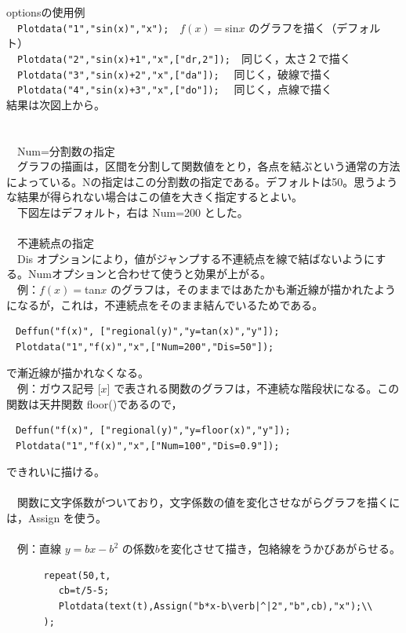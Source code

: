 \documentclass[papersize,a4paper,12pt,uplatex]{jsarticle}
\begin{document}
\begin{description}
optionsの使用例\\
　\verb|Plotdata("1","sin(x)","x");|　$f(x)=$sin$x$ のグラフを描く（デフォルト）\\
　\verb|Plotdata("2","sin(x)+1","x",["dr,2"]);|　同じく，太さ２で描く\\
　\verb|Plotdata("3","sin(x)+2","x",["da"]);|　 同じく，破線で描く\\
　\verb|Plotdata("4","sin(x)+3","x",["do"]);|　 同じく，点線で描く\\
結果は次図上から。\\
　\\
　　　　　\\

　Num=分割数の指定\\
　グラフの描画は，区間を分割して関数値をとり，各点を結ぶという通常の方法によっている。Nの指定はこの分割数の指定である。デフォルトは50。思うような結果が得られない場合はこの値を大きく指定するとよい。\\
　下図左はデフォルト，右は Num=200 とした。\\

　　　　\\

　不連続点の指定\\
　Dis オプションにより，値がジャンプする不連続点を線で結ばないようにする。Numオプションと合わせて使うと効果が上がる。\\

　例：$f(x)=$tan$x$ のグラフは，そのままではあたかも漸近線が描かれたようになるが，これは，不連続点をそのまま結んでいるためである。
\begin{verbatim}
　Deffun("f(x)", ["regional(y)","y=tan(x)","y"]);
　Plotdata("1","f(x)","x",["Num=200","Dis=50"]);
\end{verbatim}
で漸近線が描かれなくなる。\\

　例：ガウス記号 [$x$] で表される関数のグラフは，不連続な階段状になる。この関数は天井関数 floor()であるので，
\begin{verbatim}
　Deffun("f(x)", ["regional(y)","y=floor(x)","y"]);
　Plotdata("1","f(x)","x",["Num=100","Dis=0.9"]);
\end{verbatim}
できれいに描ける。\\

　　　　　　　\\

　関数に文字係数がついており，文字係数の値を変化させながらグラフを描くには，Assign を使う。\\
　\\
　例：直線 $y=bx-b^2$ の係数$b$を変化させて描き，包絡線をうかびあがらせる。
\begin{verbatim}
　　　　repeat(50,t,
 　　　　　cb=t/5-5;
 　　　　　Plotdata(text(t),Assign("b*x-b\verb|^|2","b",cb),"x");\\
　　　　);
\end{verbatim}
　\\
　　　　　　\\


\end{description}
\end{document}
